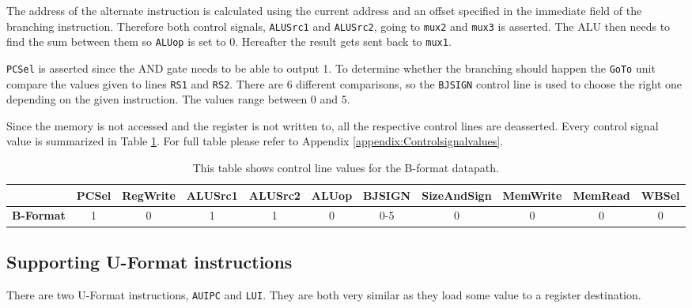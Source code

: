         The address of the alternate instruction is calculated using the current address and an offset specified in the immediate field of the branching instruction. Therefore both control signals, \texttt{ALUSrc1} and \texttt{ALUSrc2}, going to \texttt{mux2} and \texttt{mux3} is asserted. The ALU then needs to find the sum between them so \texttt{ALUop} is set to 0. Hereafter the result gets sent back to \texttt{mux1}.
        
        \texttt{PCSel} is asserted since the AND gate needs to be able to output 1. To determine whether the branching should happen the \texttt{GoTo} unit compare the values given to lines \texttt{RS1} and \texttt{RS2}. There are 6 different comparisons, so the \texttt{BJSIGN} control line is used to choose the right one depending on the given instruction. The values range between 0 and 5.
        
        Since the memory is not accessed and the register is not written to, all the respective control lines are deasserted. Every control signal value is summarized in Table \ref{table:BFORMAT}. For full table please refer to Appendix \ref{appendix:Controlsignalvalues}.
        
        \begin{table}[h!]
            \small
            \hspace{-2.4cm}
            \begin{tabular}{|c||c|c|c|c|c|c|c|c|c|c|}
            	\hline
            	                  & \textbf{PCSel} & \textbf{RegWrite} & \textbf{ALUSrc1} & \textbf{ALUSrc2} & \textbf{ALUop} & \textbf{BJSIGN} & \textbf{SizeAndSign} & \textbf{MemWrite} & \textbf{MemRead} & \textbf{WBSel} \\ \hline\hline
            	\textbf{B-Format} &       1        &         0         &        1         &        1         &       0        &        0-5        &         0          &         0         &        0         &       0        \\ \hline
            \end{tabular}
            \caption{This table shows control line values for the B-format datapath.}
            \label{table:BFORMAT}
        \end{table}
    \subsection{Supporting U-Format instructions}
        There are two U-Format instructions, \texttt{AUIPC} and \texttt{LUI}. They are both very similar as they load some value to a register destination. 
        
